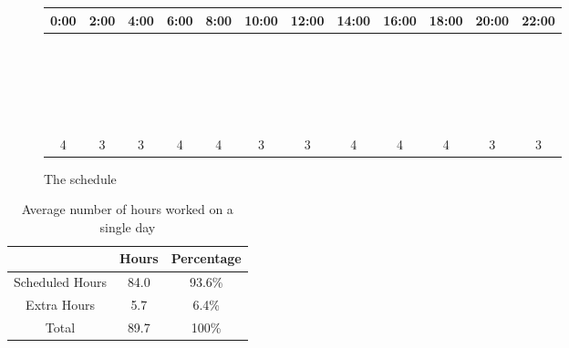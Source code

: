 \begin{figure}
	\centering
\begin{tabular}{|c|c|c|c|c|c|c|c|c|c|c|c|}
	\hline
	0:00 & 2:00 & 4:00 & 6:00 & 8:00 & 10:00 & 12:00 & 14:00 & 16:00 & 18:00 & 20:00 & 22:00  \\
	\hline
	\hline
	\cc & \cc & & & & & & & & & & \\ \hline
	& \cc & \cc & & & & & & & & & \\ \hline
	& \cc & \cc & & & & & & & & & \\ \hline
	& & \cc & \cc & & & & & & & & \\ \hline
	& & & \cc & \cc & & & & & & & \\ \hline
	& & & \cc & \cc & & & & & & & \\ \hline
	& & & \cc & \cc & & & & & & & \\ \hline
	& & & & \cc & \cc & & & & & & \\ \hline
	& & & & & \cc & \cc & & & & & \\ \hline
	& & & & & \cc & \cc & & & & & \\ \hline
	& & & & & & \cc & \cc & & & & \\ \hline
	& & & & & & & \cc & \cc & & & \\ \hline
	& & & & & & & \cc & \cc & & & \\ \hline
	& & & & & & & \cc & \cc & & & \\ \hline
	& & & & & & & & \cc & \cc & & \\ \hline
	& & & & & & & & & \cc & \cc & \\ \hline
	& & & & & & & & & \cc & \cc & \\ \hline
	& & & & & & & & & \cc & \cc & \\ \hline
	\cc & & & & & & & & & & & \cc \\ \hline
	\cc & & & & & & & & & & & \cc \\ \hline
	\cc & & & & & & & & & & & \cc \\ 
	\hline
	\hline
	4 & 3 & 3 & 4 & 4 & 3 & 3 & 4 & 4 & 4 & 3 & 3\\
	\hline
\end{tabular}
\caption{The schedule}
\label{fig:schedule}
\end{figure}

\begin{table}
	\centering
\begin{tabular}{|c|c|c|}
	\hline
	& Hours & Percentage \\ \hline \hline
	Scheduled Hours & 84.0 & 93.6\%\\
	Extra Hours & 5.7 & 6.4\% \\
	\hline
	\hline
	Total & 89.7 & 100\% \\
	\hline
\end{tabular}
\caption{Average number of hours worked on a single day}
\label{tab:hours}
\end{table}

